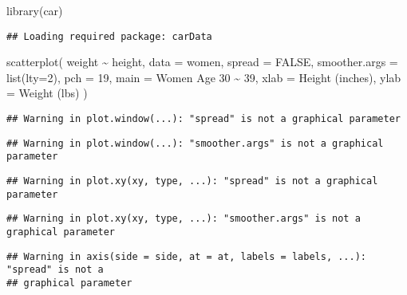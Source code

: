 \documentclass[
]{article}
\newenvironment{Shaded}{\begin{snugshade}}{\end{snugshade}}
\newcommand{\AttributeTok}[1]{\textcolor[rgb]{0.77,0.63,0.00}{#1}}
\newcommand{\ConstantTok}[1]{\textcolor[rgb]{0.00,0.00,0.00}{#1}}
\newcommand{\DecValTok}[1]{\textcolor[rgb]{0.00,0.00,0.81}{#1}}
\newcommand{\FunctionTok}[1]{\textcolor[rgb]{0.00,0.00,0.00}{#1}}
\newcommand{\NormalTok}[1]{#1}
\newcommand{\SpecialCharTok}[1]{\textcolor[rgb]{0.00,0.00,0.00}{#1}}
\newcommand{\StringTok}[1]{\textcolor[rgb]{0.31,0.60,0.02}{#1}}
\begin{document}
\begin{Shaded}
\begin{Highlighting}[]
\FunctionTok{library}\NormalTok{(car)}
\end{Highlighting}
\end{Shaded}

\begin{verbatim}
## Loading required package: carData
\end{verbatim}

\begin{Shaded}
\begin{Highlighting}[]
\FunctionTok{scatterplot}\NormalTok{(}
\NormalTok{  weight }\SpecialCharTok{\textasciitilde{}}\NormalTok{ height, }
  \AttributeTok{data =}\NormalTok{ women, }
  \AttributeTok{spread =} \ConstantTok{FALSE}\NormalTok{, }
  \AttributeTok{smoother.args =} \FunctionTok{list}\NormalTok{(}\AttributeTok{lty=}\DecValTok{2}\NormalTok{), }
  \AttributeTok{pch =} \DecValTok{19}\NormalTok{,}
  \AttributeTok{main =} \StringTok{\textquotesingle{}Women Age 30 \textasciitilde{} 39\textquotesingle{}}\NormalTok{,}
  \AttributeTok{xlab =} \StringTok{\textquotesingle{}Height (inches)\textquotesingle{}}\NormalTok{,}
  \AttributeTok{ylab =} \StringTok{\textquotesingle{}Weight (lbs)\textquotesingle{}} 
\NormalTok{)}
\end{Highlighting}
\end{Shaded}

\begin{verbatim}
## Warning in plot.window(...): "spread" is not a graphical parameter
\end{verbatim}

\begin{verbatim}
## Warning in plot.window(...): "smoother.args" is not a graphical parameter
\end{verbatim}

\begin{verbatim}
## Warning in plot.xy(xy, type, ...): "spread" is not a graphical parameter
\end{verbatim}

\begin{verbatim}
## Warning in plot.xy(xy, type, ...): "smoother.args" is not a graphical parameter
\end{verbatim}

\begin{verbatim}
## Warning in axis(side = side, at = at, labels = labels, ...): "spread" is not a
## graphical parameter
\end{verbatim}
\end{document}
